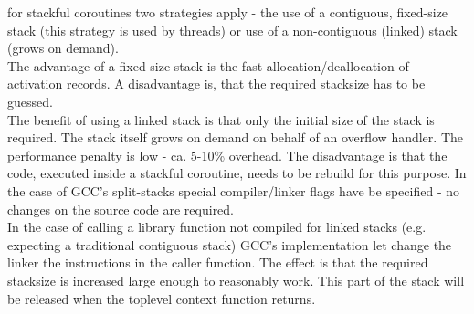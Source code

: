 for stackful coroutines two strategies apply - the use of a contiguous,
fixed-size stack (this strategy is used by threads) or use of a non-contiguous
(linked) stack (grows on demand).\\
The advantage of a fixed-size stack is the fast allocation/deallocation of 
activation records. A disadvantage is, that the required stacksize has to
be guessed.\\
The benefit of using a linked stack is that only the initial size of the stack
is required. The stack itself grows on demand on behalf of an overflow handler.
The performance penalty is low - ca. 5-10\% overhead. The disadvantage is that
the code, executed inside a stackful coroutine, needs to be rebuild for this
purpose. In the case of GCC's split-stacks special compiler/linker flags have be
specified - no changes on the source code are required.\\
In the case of calling a library function not compiled for linked stacks
(e.g. expecting a traditional contiguous stack) GCC's implementation let change
the linker the instructions in the caller function. The effect is that the
required stacksize is increased large enough to reasonably work. This part of
the stack will be released when the toplevel context function returns.
